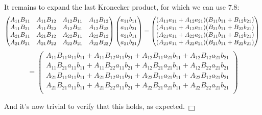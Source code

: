 \documentclass[solutions.tex]{subfiles}
\begin{document}
It remains to expand the last Kronecker product, for which we
can use $7.8$:
\[
	\begin{pmatrix}
		A_{11}B_{11} & A_{11}B_{12} & A_{12}B_{11} & A_{12}B_{12} \\
		A_{11}B_{21} & A_{11}B_{22} & A_{12}B_{21} & A_{12}B_{22} \\
		A_{21}B_{11} & A_{21}B_{12} & A_{22}B_{11} & A_{22}B_{12} \\
		A_{21}B_{21} & A_{21}B_{22} & A_{22}B_{21} & A_{22}B_{22} \\
	\end{pmatrix}\begin{pmatrix}
		a_{11}b_{11} \\
		a_{11}b_{21} \\
		a_{21}b_{11} \\
		a_{21}b_{21} \\
	\end{pmatrix} = \begin{pmatrix}
		(A_{11}a_{11}+A_{12}a_{21})(B_{11}b_{11}+B_{12}b_{21}) \\
		(A_{11}a_{11}+A_{12}a_{21})(B_{21}b_{11}+B_{22}b_{21}) \\
		(A_{21}a_{11}+A_{22}a_{21})(B_{11}b_{11}+B_{12}b_{21}) \\
		(A_{21}a_{11}+A_{22}a_{21})(B_{21}b_{11}+B_{22}b_{21}) \\
	\end{pmatrix} \\
\]
\[
	= \begin{pmatrix}
		A_{11}B_{11}a_{11}b_{11}
		+ A_{11}B_{12}a_{11}b_{21}
		+ A_{12}B_{11}a_{21}b_{11}
		+ A_{12}B_{12}a_{21}b_{21} \\
		A_{11}B_{21}a_{11}b_{11}
		+A_{11}B_{22}a_{11}b_{21}
		+A_{12}B_{21}a_{21}b_{11}
		+A_{12}B_{22}a_{21}b_{21} \\
		A_{21}B_{11}a_{11}b_{11}
		+A_{21}B_{12}a_{11}b_{21}
		+A_{22}B_{11}a_{21}b_{11}
		+A_{22}B_{12}a_{21}b_{21} \\
		A_{21}B_{21}a_{11}b_{11}
		+A_{21}B_{22}a_{11}b_{21}
		+A_{22}B_{21}a_{21}b_{11}
		+A_{22}B_{22}a_{21}b_{21} \\
	\end{pmatrix}
\]

And it's now trivial to verify that this holds, as expected. $\qed$
\end{document}
